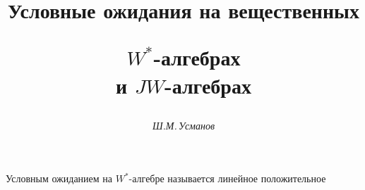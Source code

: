

 




\newcommand{\tts}[1]{} 


 




\setcounter{page}{43} 












 


\author{\it Ш.М.\,Усманов} 




\title{Условные ожидания на вещественных  


$W^*$-алгебрах\\ и $JW$-алгебрах} 


 


\date{} 




\pagestyle{plain} %


 




\maketitle 


\label{begin} 


 


Условным ожиданием на $W^*$-алгебре называется линейное положительное 


